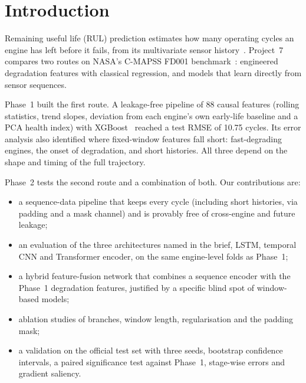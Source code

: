 \section{Introduction}
Remaining useful life (RUL) prediction estimates how many operating cycles an engine has left before it fails, from its multivariate sensor history~\cite{lei2018review}. Project~7 compares two routes on NASA's C-MAPSS FD001 benchmark~\cite{saxena2008damage,saxena2008dataset}: engineered degradation features with classical regression, and models that learn directly from sensor sequences.

Phase~1 built the first route. A leakage-free pipeline of 88 causal features (rolling statistics, trend slopes, deviation from each engine's own early-life baseline and a PCA health index) with XGBoost~\cite{chen2016xgboost} reached a test RMSE of 10.75 cycles. Its error analysis also identified where fixed-window features fall short: fast-degrading engines, the onset of degradation, and short histories. All three depend on the shape and timing of the full trajectory.

Phase~2 tests the second route and a combination of both. Our contributions are:
\begin{itemize}
  \item a sequence-data pipeline that keeps every cycle (including short histories, via padding and a mask channel) and is provably free of cross-engine and future leakage;
  \item an evaluation of the three architectures named in the brief, LSTM, temporal CNN and Transformer encoder, on the same engine-level folds as Phase~1;
  \item a hybrid feature-fusion network that combines a sequence encoder with the Phase~1 degradation features, justified by a specific blind spot of window-based models;
  \item ablation studies of branches, window length, regularisation and the padding mask;
  \item a validation on the official test set with three seeds, bootstrap confidence intervals, a paired significance test against Phase~1, stage-wise errors and gradient saliency.
\end{itemize}
